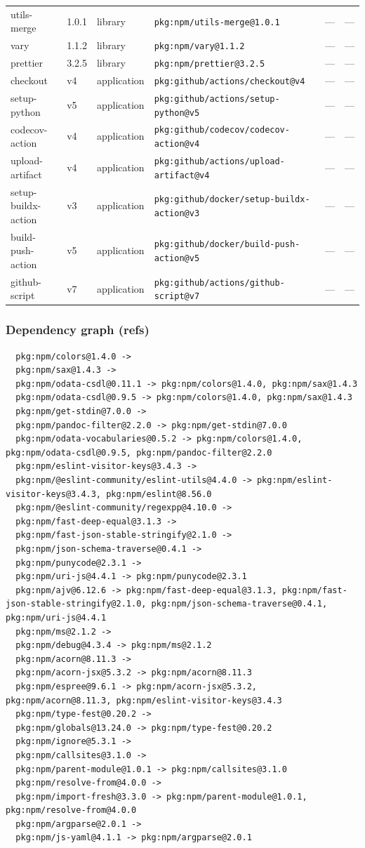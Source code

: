 \documentclass[11pt]{article}
\begin{document}
\begin{longtable}{|l|l|l|p{2.2cm}|l|p{4cm}|}
utils-merge & 1.0.1 & library & \texttt{pkg:npm/utils-merge@1.0.1} & — & — \\
vary & 1.1.2 & library & \texttt{pkg:npm/vary@1.1.2} & — & — \\
prettier & 3.2.5 & library & \texttt{pkg:npm/prettier@3.2.5} & — & — \\
checkout & v4 & application & \texttt{pkg:github/actions/checkout@v4} & — & — \\
setup-python & v5 & application & \texttt{pkg:github/actions/setup-python@v5} & — & — \\
codecov-action & v4 & application & \texttt{pkg:github/codecov/codecov-action@v4} & — & — \\
upload-artifact & v4 & application & \texttt{pkg:github/actions/upload-artifact@v4} & — & — \\
setup-buildx-action & v3 & application & \texttt{pkg:github/docker/setup-buildx-action@v3} & — & — \\
build-push-action & v5 & application & \texttt{pkg:github/docker/build-push-action@v5} & — & — \\
github-script & v7 & application & \texttt{pkg:github/actions/github-script@v7} & — & — \\
\hline
\end{longtable}

\subsubsection*{Dependency graph (refs)}
\begin{verbatim}
  pkg:npm/colors@1.4.0 -> 
  pkg:npm/sax@1.4.3 -> 
  pkg:npm/odata-csdl@0.11.1 -> pkg:npm/colors@1.4.0, pkg:npm/sax@1.4.3
  pkg:npm/odata-csdl@0.9.5 -> pkg:npm/colors@1.4.0, pkg:npm/sax@1.4.3
  pkg:npm/get-stdin@7.0.0 -> 
  pkg:npm/pandoc-filter@2.2.0 -> pkg:npm/get-stdin@7.0.0
  pkg:npm/odata-vocabularies@0.5.2 -> pkg:npm/colors@1.4.0, pkg:npm/odata-csdl@0.9.5, pkg:npm/pandoc-filter@2.2.0
  pkg:npm/eslint-visitor-keys@3.4.3 -> 
  pkg:npm/@eslint-community/eslint-utils@4.4.0 -> pkg:npm/eslint-visitor-keys@3.4.3, pkg:npm/eslint@8.56.0
  pkg:npm/@eslint-community/regexpp@4.10.0 -> 
  pkg:npm/fast-deep-equal@3.1.3 -> 
  pkg:npm/fast-json-stable-stringify@2.1.0 -> 
  pkg:npm/json-schema-traverse@0.4.1 -> 
  pkg:npm/punycode@2.3.1 -> 
  pkg:npm/uri-js@4.4.1 -> pkg:npm/punycode@2.3.1
  pkg:npm/ajv@6.12.6 -> pkg:npm/fast-deep-equal@3.1.3, pkg:npm/fast-json-stable-stringify@2.1.0, pkg:npm/json-schema-traverse@0.4.1, pkg:npm/uri-js@4.4.1
  pkg:npm/ms@2.1.2 -> 
  pkg:npm/debug@4.3.4 -> pkg:npm/ms@2.1.2
  pkg:npm/acorn@8.11.3 -> 
  pkg:npm/acorn-jsx@5.3.2 -> pkg:npm/acorn@8.11.3
  pkg:npm/espree@9.6.1 -> pkg:npm/acorn-jsx@5.3.2, pkg:npm/acorn@8.11.3, pkg:npm/eslint-visitor-keys@3.4.3
  pkg:npm/type-fest@0.20.2 -> 
  pkg:npm/globals@13.24.0 -> pkg:npm/type-fest@0.20.2
  pkg:npm/ignore@5.3.1 -> 
  pkg:npm/callsites@3.1.0 -> 
  pkg:npm/parent-module@1.0.1 -> pkg:npm/callsites@3.1.0
  pkg:npm/resolve-from@4.0.0 -> 
  pkg:npm/import-fresh@3.3.0 -> pkg:npm/parent-module@1.0.1, pkg:npm/resolve-from@4.0.0
  pkg:npm/argparse@2.0.1 -> 
  pkg:npm/js-yaml@4.1.1 -> pkg:npm/argparse@2.0.1
\end{verbatim}
\end{document}
